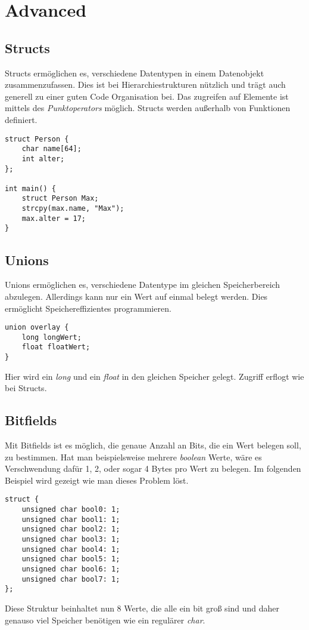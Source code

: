 \documentclass[11pt,a4paper]{article}
\author{Nico Fröhlich}
\begin{document}
\section{Advanced}

\subsection{Structs}

Structs ermöglichen es, verschiedene Datentypen in einem Datenobjekt zusammenzufassen. Dies ist bei Hierarchiestrukturen nützlich und trägt auch generell zu einer guten Code Organisation bei. Das zugreifen auf Elemente ist mittels des \textit{Punktoperators} möglich.
Structs werden außerhalb von Funktionen definiert.
\begin{verbatim}
struct Person {
    char name[64];
    int alter;
};

int main() {
    struct Person Max;
    strcpy(max.name, "Max");
    max.alter = 17;
}
\end{verbatim}

\subsection{Unions}
Unions ermöglichen es, verschiedene Datentype im gleichen Speicherbereich abzulegen. Allerdings kann nur ein Wert auf einmal belegt werden. Dies ermöglicht Speichereffizientes programmieren.
\begin{verbatim}
union overlay {
    long longWert;
    float floatWert;
}
\end{verbatim}
Hier wird ein \textit{long} und ein \textit{float} in den gleichen Speicher gelegt. Zugriff erflogt wie bei Structs.

\subsection{Bitfields}
Mit Bitfields ist es möglich, die genaue Anzahl an Bits, die ein Wert belegen soll, zu bestimmen. Hat man beispielsweise mehrere \textit{boolean} Werte, wäre es Verschwendung dafür 1, 2, oder sogar 4 Bytes pro Wert zu belegen. Im folgenden Beispiel wird gezeigt wie man dieses Problem löst.
\newpage
\begin{verbatim}
struct {
    unsigned char bool0: 1;
    unsigned char bool1: 1;
    unsigned char bool2: 1;
    unsigned char bool3: 1;
    unsigned char bool4: 1;
    unsigned char bool5: 1;
    unsigned char bool6: 1;
    unsigned char bool7: 1;
};
\end{verbatim}
Diese Struktur beinhaltet nun 8 Werte, die alle ein bit groß sind und daher genauso viel Speicher benötigen wie ein regulärer \textit{char}.
\end{document}
